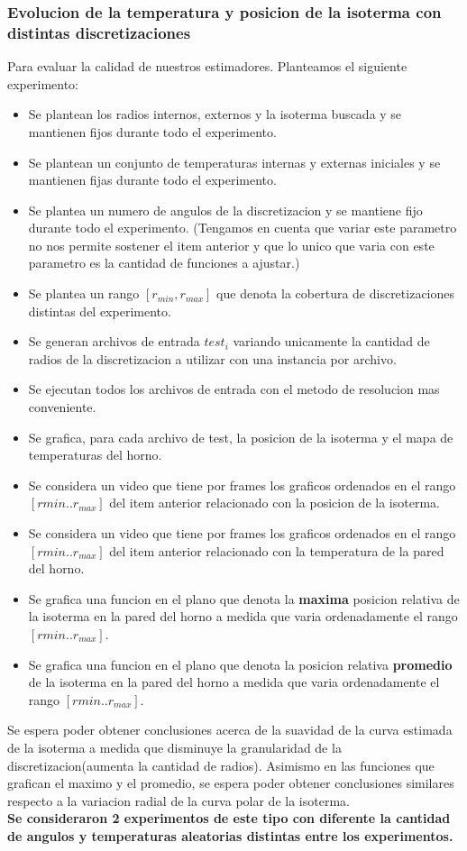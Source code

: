 \subsubsection{Evolucion de la temperatura y posicion de la isoterma con distintas discretizaciones}
Para evaluar la calidad de nuestros estimadores. Planteamos el siguiente experimento:
\begin{itemize}
    \item Se plantean los radios internos, externos y la isoterma buscada y se mantienen fijos durante todo el experimento.
    \item Se plantean un conjunto de temperaturas internas y externas iniciales y se mantienen fijas durante todo el experimento.
    \item Se plantea un numero de angulos de la discretizacion y se mantiene fijo durante todo el experimento. (Tengamos en cuenta que variar este parametro no nos permite sostener el item anterior y que lo unico que varia con este parametro es la cantidad de funciones a ajustar.) 
    \item Se plantea un rango $[r_{min}, r_{max}]$ que denota la cobertura de discretizaciones distintas del experimento.
    \item Se generan archivos de entrada $test_i$ variando unicamente la cantidad de radios de la discretizacion a utilizar con una instancia por archivo.
    \item Se ejecutan todos los archivos de entrada con el metodo de resolucion mas conveniente.
    \item Se grafica, para cada archivo de test, la posicion de la isoterma y el mapa de temperaturas del horno.
    \item Se considera un video que tiene por frames los graficos ordenados en el rango $[r{min}..r_{max}]$ del item anterior relacionado con la posicion de la isoterma.
    \item Se considera un video que tiene por frames los graficos ordenados en el rango $[r{min}..r_{max}]$ del item anterior relacionado con la temperatura de la pared del horno.
    \item Se grafica una funcion en el plano que denota la \textbf{maxima} posicion relativa de la isoterma en la pared del horno a medida que varia ordenadamente el rango $[r{min}..r_{max}]$.
    \item Se grafica una funcion en el plano que denota la posicion relativa \textbf{promedio} de la isoterma en la pared del horno a medida que varia ordenadamente el rango $[r{min}..r_{max}]$.
\end{itemize}

Se espera poder obtener conclusiones acerca de la suavidad de la curva estimada de la isoterma a medida que disminuye la granularidad de la discretizacion(aumenta la cantidad de radios). Asimismo en las funciones que grafican el maximo y el promedio, se espera poder obtener conclusiones similares respecto a la variacion radial de la curva polar de la isoterma.\\
\textbf{Se consideraron 2 experimentos de este tipo con diferente la cantidad de angulos y temperaturas aleatorias distintas entre los experimentos.}

